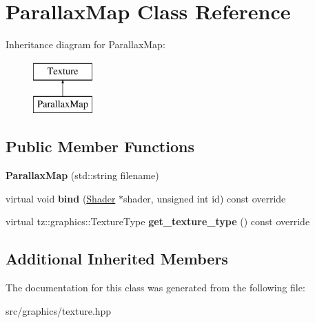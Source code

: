 \hypertarget{class_parallax_map}{}\section{Parallax\+Map Class Reference}
\label{class_parallax_map}
Inheritance diagram for Parallax\+Map\+:\begin{figure}[H]
\begin{center}
\leavevmode
\includegraphics[height=2.000000cm]{class_parallax_map}
\end{center}
\end{figure}
\subsection*{Public Member Functions}
\begin{DoxyCompactItemize}
\item 
\mbox{\label{class_parallax_map_a0d7a4d44bf8c5cd8dd920938d6d1e0d2}} 
{\bfseries Parallax\+Map} (std\+::string filename)
\item 
\mbox{\label{class_parallax_map_a2c894a6060a338e9e5c9830bd4c5e93a}} 
virtual void {\bfseries bind} (\mbox{\hyperlink{class_shader}{Shader}} $\ast$shader, unsigned int id) const override
\item 
\mbox{\label{class_parallax_map_a56dba3af3087e0f6de74150685881415}} 
virtual tz\+::graphics\+::\+Texture\+Type {\bfseries get\+\_\+texture\+\_\+type} () const override
\end{DoxyCompactItemize}
\subsection*{Additional Inherited Members}


The documentation for this class was generated from the following file\+:\begin{DoxyCompactItemize}
\item 
src/graphics/texture.\+hpp\end{DoxyCompactItemize}
